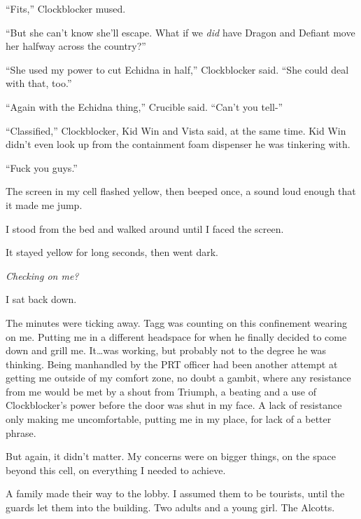 ``Fits,'' Clockblocker mused.



``But she can't know she'll escape.  What if we \emph{did} have Dragon and Defiant move her halfway across the country?''



``She used my power to cut Echidna in half,'' Clockblocker said.  ``She could deal with that, too.''



``Again with the Echidna thing,'' Crucible said.  ``Can't you tell-''



``Classified,'' Clockblocker, Kid Win and Vista said, at the same time.  Kid Win didn't even look up from the containment foam dispenser he was tinkering with.



``Fuck you guys.''



The screen in my cell flashed yellow, then beeped once, a sound loud enough that it made me jump.



I stood from the bed and walked around until I faced the screen.



It stayed yellow for long seconds, then went dark.



\emph{Checking on me?}



I sat back down.



The minutes were ticking away.  Tagg was counting on this confinement wearing on me.  Putting me in a different headspace for when he finally decided to come down and grill me.  It\ldots was working, but probably not to the degree he was thinking.  Being manhandled by the PRT officer had been another attempt at getting me outside of my comfort zone, no doubt a gambit, where any resistance from me would be met by a shout from Triumph, a beating and a use of Clockblocker's power before the door was shut in my face.  A lack of resistance only making me uncomfortable, putting me in my place, for lack of a better phrase.



But again, it didn't matter.  My concerns were on bigger things, on the space beyond this cell, on everything I needed to achieve.



A family made their way to the lobby.  I assumed them to be tourists, until the guards let them into the building.  Two adults and a young girl.  The Alcotts.



